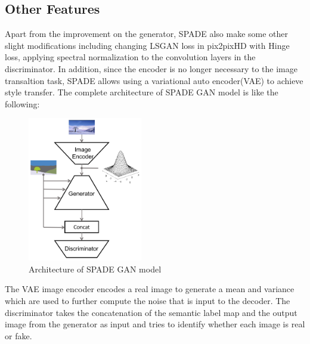 \subsection{Other Features}
Apart from the improvement on the generator, SPADE also make some other slight modifications
including changing LSGAN loss in pix2pixHD with 
Hinge loss, applying spectral normalization to the convolution layers in the discriminator.
In addition, since the encoder is no longer necessary to the image transaltion task, SPADE 
allows using a variational auto encoder(VAE) to achieve style transfer. The complete 
architecture of SPADE GAN model is like the following:
\begin{figure}[H]
    \begin{center}
    \includegraphics[width=5cm]{figures/SPADE-architecture}
    \end{center}
    \caption{Architecture of SPADE GAN model}
    \label{fig:SPADE-architecture}
\end{figure}
The VAE image encoder encodes a real image to generate a mean and variance which are used 
to further compute the noise that is input to the decoder. The discriminator takes the 
concatenation of the semantic label map and the output image from the generator as input 
and tries to identify whether each image is real or fake.


